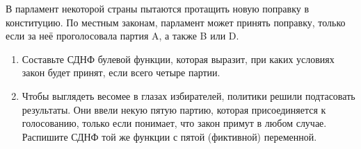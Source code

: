 \question
В парламент некоторой страны пытаются протащить новую поправку в конституцию. По местным законам, парламент может принять поправку, только если за неё проголосовала партия A, а также B или D.

\begin{enumerate}
    \item Составьте СДНФ булевой функции, которая выразит, при каких условиях закон будет принят, если всего четыре партии.
    \item Чтобы выглядеть весомее в глазах избирателей, политики решили подтасовать результаты.  Они ввели некую пятую партию, которая присоединяется к голосованию, только если понимает, что закон примут в любом случае. Распишите СДНФ той же функции с пятой (фиктивной) переменной.
\end{enumerate}